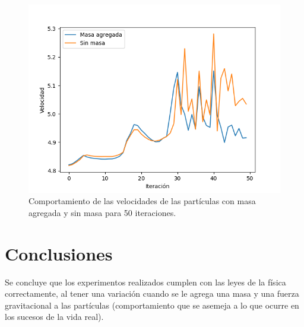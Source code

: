 \documentclass{article}
\begin{document}
\begin{figure}
\centering
	\includegraphics[width=\linewidth]{Figure_1.png}
	\caption{Comportamiento de las velocidades de las partículas con masa agregada y sin masa para 50 iteraciones.}
	\label{1}		
\end{figure}
\section{Conclusiones}
Se concluye que los experimentos realizados cumplen con las leyes de la física correctamente, al tener una variación cuando se le agrega una masa y una fuerza gravitacional a las partículas (comportamiento que se asemeja a lo que ocurre en los sucesos de la vida real).



\end{document}
